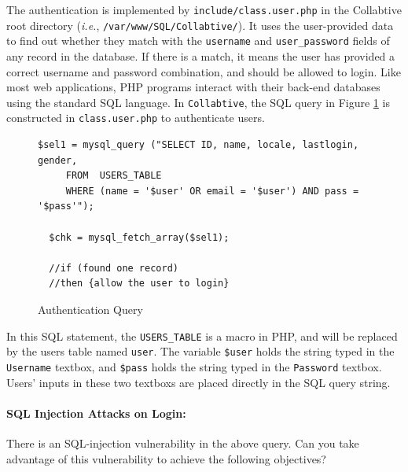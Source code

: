 \documentclass{article}
\begin{document}
The authentication is implemented by {\tt include/class.user.php} in the
Collabtive root directory (\emph{i.e.}, {\tt /var/www/SQL/Collabtive/}).
It uses the user-provided data to find out whether 
they match with the {\tt username} and {\tt user\_password} fields of any record 
in the database. If there is a match, it means the user has provided a correct 
username and password combination, and should be allowed to login.
Like most web applications, PHP programs interact with their back-end databases using the 
standard SQL language. In {\tt Collabtive}, the SQL query in Figure \ref{fig:querysyn} is 
constructed in {\tt class.user.php} to authenticate users.
\begin{figure}
\begin{Verbatim}[frame=single]
  $sel1 = mysql_query ("SELECT ID, name, locale, lastlogin, gender, 
     FROM  USERS_TABLE 
     WHERE (name = '$user' OR email = '$user') AND pass = '$pass'");

  $chk = mysql_fetch_array($sel1);

  //if (found one record)
  //then {allow the user to login}
\end{Verbatim}
\caption{Authentication Query}
\label{fig:querysyn}
\end{figure}

In this SQL statement, the {\tt USERS\_TABLE} is a macro in PHP, and 
will be replaced by the users table named {\tt user}. 
The variable {\tt \$user} holds the string typed in the {\tt Username} textbox, 
and {\tt \$pass} holds the string typed in the {\tt Password} textbox. 
Users' inputs in these two textboxs are 
placed directly in the SQL query string. 

\paragraph{SQL Injection Attacks on Login:}
There is an SQL-injection vulnerability 
in the above query. Can you take advantage of this vulnerability to 
achieve the following objectives?
\end{document}
